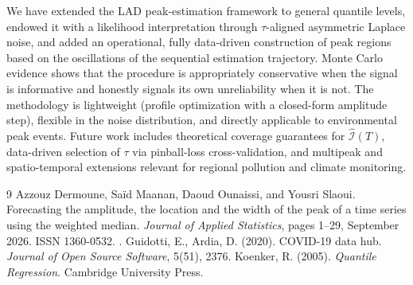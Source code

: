 \documentclass[11pt,a4paper]{article}
\begin{document}
We have extended the LAD peak-estimation framework to general quantile
levels, endowed it with a likelihood interpretation through $\tau$-aligned
asymmetric Laplace noise, and added an operational, fully data-driven
construction of peak regions based on the oscillations of the sequential
estimation trajectory. Monte Carlo evidence shows that the procedure is
appropriately conservative when the signal is informative and honestly
signals its own unreliability when it is not. The methodology is lightweight
(profile optimization with a closed-form amplitude step), flexible in the
noise distribution, and directly applicable to environmental peak events.
Future work includes theoretical coverage guarantees for
$\widehat{\mathcal I}(T)$, data-driven selection of $\tau$ via pinball-loss
cross-validation, and multipeak and spatio-temporal extensions relevant for
regional pollution and climate monitoring.

{\small
\begin{thebibliography}{9}
\setlength{\itemsep}{2pt}
Azzouz Dermoune, Saïd Maanan, Daoud Ounaissi, and Yousri Slaoui.
\newblock Forecasting the amplitude, the location and the width of the peak of
a time series using the weighted median.
\newblock \emph{Journal of Applied Statistics}, pages 1--29, September 2026.
\newblock ISSN 1360-0532.
\newblock {}.
Guidotti, E., Ardia, D. (2020). COVID-19 data hub. \emph{Journal of Open
Source Software}, 5(51), 2376.
Koenker, R. (2005). \emph{Quantile Regression}. Cambridge University Press.
\end{thebibliography}
}
\end{document}
